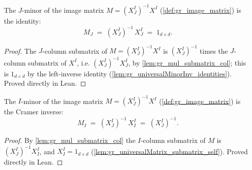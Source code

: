 \begin{lemma}

  \label{lem:gr_imageMatrix_submatrix_self}
  The \(J\)-minor of the image matrix \(M = (X^I_J)^{-1} X^I\)
  (\cref{def:gr_image_matrix}) is the identity:
  \[
    M_J \;=\; (X^I_J)^{-1}\, X^I_J \;=\; 1_{d\times d}.
  \]
\end{lemma}
\begin{proof}

\leanok
  The \(J\)-column submatrix of \(M = (X^I_J)^{-1} X^I\) is
  \((X^I_J)^{-1}\) times the \(J\)-column submatrix of \(X^I\), i.e.
  \((X^I_J)^{-1} X^I_J\), by \cref{lem:gr_mul_submatrix_col}; this is
  \(1_{d\times d}\) by the left-inverse identity
  (\cref{lem:gr_universalMinorInv_identities}). Proved directly in Lean.
\end{proof}

\begin{lemma}

  \label{lem:gr_imageMatrix_submatrix_I}
  The \(I\)-minor of the image matrix \(M = (X^I_J)^{-1} X^I\)
  (\cref{def:gr_image_matrix}) is the Cramer inverse:
  \[
    M_I \;=\; (X^I_J)^{-1}\, X^I_I \;=\; (X^I_J)^{-1}.
  \]
\end{lemma}
\begin{proof}

\leanok
  By \cref{lem:gr_mul_submatrix_col} the \(I\)-column submatrix of \(M\) is
  \((X^I_J)^{-1} X^I_I\), and \(X^I_I = 1_{d\times d}\)
  (\cref{lem:gr_universalMatrix_submatrix_self}). Proved directly in Lean.
\end{proof}

